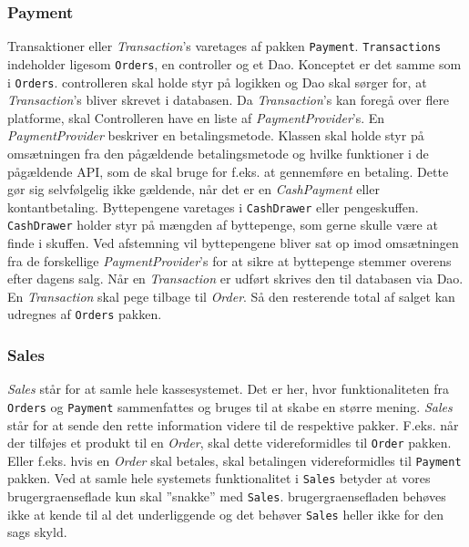 \subsubsection{Payment}
Transaktioner eller \textit{Transaction}'s varetages af pakken \texttt{Payment}. \texttt{Transactions} indeholder ligesom \texttt{Orders}, en \Gls{controller} og et \Gls{Dao}. Konceptet er det samme som i \texttt{Orders}. \Gls{controller}en skal holde styr på logikken og \Gls{Dao} skal sørger for, at \textit{Transaction}'s bliver skrevet i databasen.
\newline\newline
Da \textit{Transaction}'s kan foregå over flere platforme, skal \gls{Controller}en have en liste af \textit{PaymentProvider}'s. En \textit{PaymentProvider}  beskriver en betalingsmetode. Klassen skal holde styr på omsætningen fra den pågældende betalingsmetode og hvilke funktioner i de pågældende \gls{API}, som de skal bruge for f.eks. at gennemføre en betaling. Dette gør sig selvfølgelig ikke gældende, når det er en \textit{CashPayment} eller kontantbetaling. Byttepengene varetages i \texttt{CashDrawer} eller pengeskuffen. \texttt{CashDrawer} holder styr på mængden af byttepenge, som gerne skulle være at finde i skuffen. Ved afstemning vil byttepengene bliver sat op imod omsætningen fra de forskellige \textit{PaymentProvider}'s for at sikre at byttepenge stemmer overens efter dagens salg.
\newline\newline
Når en \textit{Transaction} er udført skrives den til databasen via \gls{Dao}. En \textit{Transaction} skal pege tilbage til \textit{Order}. Så den resterende total af salget kan udregnes af \texttt{Orders} pakken.

\subsubsection{Sales}
\textit{Sales} står for at samle hele kassesystemet. Det er her, hvor funktionaliteten fra \texttt{Orders} og \texttt{Payment} sammenfattes og bruges til at skabe en større mening. \textit{Sales} står for at sende den rette information videre til de respektive pakker. F.eks. når der tilføjes et produkt til en \textit{Order}, skal dette videreformidles til \texttt{Order} pakken. Eller f.eks. hvis en \textit{Order} skal betales, skal betalingen videreformidles til \texttt{Payment} pakken.
\newline\newline
Ved at samle hele systemets funktionalitet i \texttt{Sales} betyder at vores \gls{brugergraenseflade} kun skal ''snakke'' med \texttt{Sales}. \Gls{brugergraenseflade}n behøves ikke at kende til al det underliggende og det behøver \texttt{Sales} heller ikke for den sags skyld.